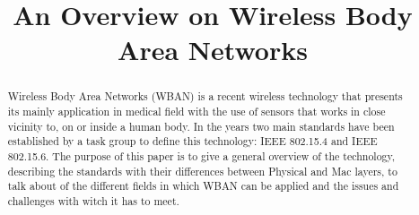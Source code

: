 \documentclass[conference]{IEEEtran}
\begin{document}
\title{An Overview on Wireless Body Area Networks}

\author{
	
}

\maketitle

\begin{abstract}
Wireless Body Area Networks (WBAN) is a recent wireless technology that presents its mainly application in medical field with the use of sensors that works in close vicinity to, on or inside a human body. In the years two main standards have been established by a task group to define this technology: IEEE 802.15.4 and IEEE 802.15.6. The purpose of this paper is to give a general overview of the technology, describing the standards with their differences between Physical and Mac layers, to talk about of the different fields in which WBAN can be applied and the issues and challenges with witch it has to meet.
\end{abstract}
\hfill
%
\end{document}
